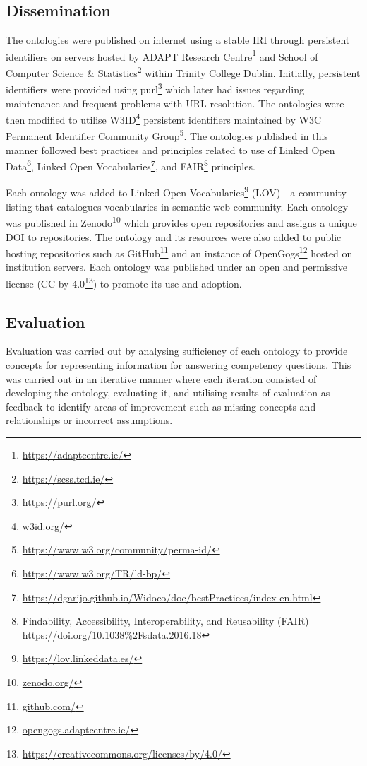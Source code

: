 \subsection{Dissemination}
The ontologies were published on internet using a stable IRI through persistent identifiers on servers hosted by ADAPT Research Centre\footnote{\url{https://adaptcentre.ie/}} and School of Computer Science \& Statistics\footnote{\url{https://scss.tcd.ie/}} within Trinity College Dublin. Initially, persistent identifiers were provided using purl\footnote{\url{https://purl.org/}} which later had issues regarding maintenance and frequent problems with URL resolution. The ontologies were then modified to utilise W3ID\footnote{\url{w3id.org/}} persistent identifiers maintained by W3C Permanent Identifier Community Group\footnote{\url{https://www.w3.org/community/perma-id/}}. The ontologies published in this manner followed best practices and principles related to use of Linked Open Data\footnote{\url{https://www.w3.org/TR/ld-bp/}}, Linked Open Vocabularies\footnote{\url{https://dgarijo.github.io/Widoco/doc/bestPractices/index-en.html}}, and FAIR\footnote{Findability, Accessibility, Interoperability, and Reusability (FAIR) \url{https://doi.org/10.1038\%2Fsdata.2016.18}} principles.

Each ontology was added to Linked Open Vocabularies\footnote{\url{https://lov.linkeddata.es/}} (LOV) - a community listing that catalogues vocabularies in semantic web community. Each ontology was published in Zenodo\footnote{\url{zenodo.org/}} which provides open repositories and assigns a unique DOI to repositories. The ontology and its resources were also added to public hosting repositories such as GitHub\footnote{\url{github.com/}} and an instance of OpenGogs\footnote{\url{opengogs.adaptcentre.ie/}} hosted on institution servers. Each ontology was published under an open and permissive license (CC-by-4.0\footnote{\url{https://creativecommons.org/licenses/by/4.0/}}) to promote its use and adoption.

\subsection{Evaluation}
Evaluation was carried out by analysing sufficiency of each ontology to provide concepts for representing information for answering competency questions. This was carried out in an iterative manner where each iteration consisted of developing the ontology, evaluating it, and utilising results of evaluation as feedback to identify areas of improvement such as missing concepts and relationships or incorrect assumptions.

